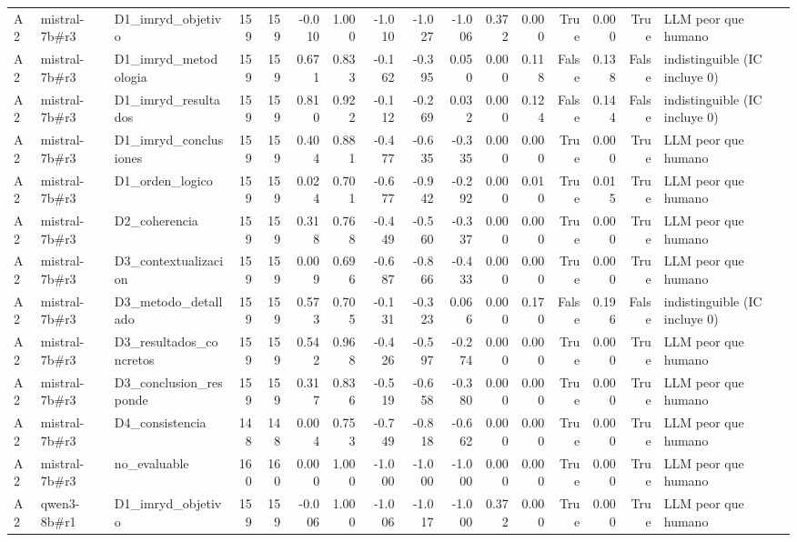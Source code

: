 \begin{table}
{\begin{tabular}{lllrrrrrrrrrrrrl}
A2 & mistral-7b\#r3 & D1\_imryd\_objetivo & 159 & 159 & -0.010 & 1.000 & -1.010 & -1.027 & -1.006 & 0.372 & 0.000 & True & 0.000 & True & LLM peor que humano \\
A2 & mistral-7b\#r3 & D1\_imryd\_metodologia & 159 & 159 & 0.671 & 0.833 & -0.162 & -0.395 & 0.050 & 0.000 & 0.118 & False & 0.138 & False & indistinguible (IC incluye 0) \\
A2 & mistral-7b\#r3 & D1\_imryd\_resultados & 159 & 159 & 0.810 & 0.922 & -0.112 & -0.269 & 0.032 & 0.000 & 0.124 & False & 0.144 & False & indistinguible (IC incluye 0) \\
A2 & mistral-7b\#r3 & D1\_imryd\_conclusiones & 159 & 159 & 0.404 & 0.881 & -0.477 & -0.635 & -0.335 & 0.000 & 0.000 & True & 0.000 & True & LLM peor que humano \\
A2 & mistral-7b\#r3 & D1\_orden\_logico & 159 & 159 & 0.024 & 0.701 & -0.677 & -0.942 & -0.292 & 0.000 & 0.010 & True & 0.015 & True & LLM peor que humano \\
A2 & mistral-7b\#r3 & D2\_coherencia & 159 & 159 & 0.318 & 0.768 & -0.449 & -0.560 & -0.337 & 0.000 & 0.000 & True & 0.000 & True & LLM peor que humano \\
A2 & mistral-7b\#r3 & D3\_contextualizacion & 159 & 159 & 0.009 & 0.696 & -0.687 & -0.866 & -0.433 & 0.000 & 0.000 & True & 0.000 & True & LLM peor que humano \\
A2 & mistral-7b\#r3 & D3\_metodo\_detallado & 159 & 159 & 0.573 & 0.705 & -0.131 & -0.323 & 0.066 & 0.000 & 0.170 & False & 0.196 & False & indistinguible (IC incluye 0) \\
A2 & mistral-7b\#r3 & D3\_resultados\_concretos & 159 & 159 & 0.542 & 0.968 & -0.426 & -0.597 & -0.274 & 0.000 & 0.000 & True & 0.000 & True & LLM peor que humano \\
A2 & mistral-7b\#r3 & D3\_conclusion\_responde & 159 & 159 & 0.317 & 0.836 & -0.519 & -0.658 & -0.380 & 0.000 & 0.000 & True & 0.000 & True & LLM peor que humano \\
A2 & mistral-7b\#r3 & D4\_consistencia & 148 & 148 & 0.004 & 0.753 & -0.749 & -0.818 & -0.662 & 0.000 & 0.000 & True & 0.000 & True & LLM peor que humano \\
A2 & mistral-7b\#r3 & no\_evaluable & 160 & 160 & 0.000 & 1.000 & -1.000 & -1.000 & -1.000 & 0.000 & 0.000 & True & 0.000 & True & LLM peor que humano \\
A2 & qwen3-8b\#r1 & D1\_imryd\_objetivo & 159 & 159 & -0.006 & 1.000 & -1.006 & -1.017 & -1.000 & 0.372 & 0.000 & True & 0.000 & True & LLM peor que humano \\

\end{tabular}}
\end{table}
